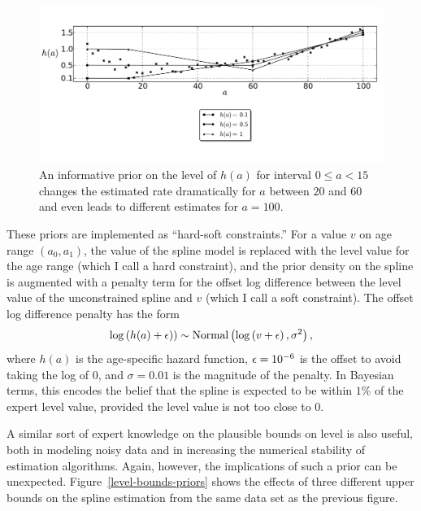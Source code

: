 \begin{figure}[h]
\begin{center}
\includegraphics[width=\textwidth]{level_value-smoothing-splines.pdf}
\caption[An informative prior on the level of $h(a)$.]{An informative
  prior on the level of $h(a)$ for interval $0 \leq a <
  15$ changes the estimated rate dramatically for $a$ between $20$ and
  $60$ and even leads to different estimates for $a = 100$.}
\label{level-value-priors}
\end{center}
\end{figure}



These priors are implemented as ``hard-soft constraints.''  For a
value $v$ on age range $(a_0,a_1)$, the value of the spline model is
replaced with the level value for the age range (which I call a hard
constraint), and the prior density on the spline is augmented with a
penalty term for the offset log difference between the level value of
the unconstrained spline and $v$ (which I call a soft constraint). The
offset log difference penalty has the form
\[
\log\left(h(a)+\epsilon)\right) \sim
 \operatorname{Normal}\left(\log\left(v + \epsilon\right), \sigma^2\right),
\]
where $h(a)$ is the age-specific hazard function, $\epsilon = 10^{-6}$ is the
offset to avoid taking the log of $0$, and $\sigma = 0.01$ is the
magnitude of the penalty.  In Bayesian terms, this encodes the belief
that the spline is expected to be within $1$\% of the expert level
value, provided the level value is not too close to $0$.

A similar sort of expert knowledge on the plausible bounds on
level is also useful, both in modeling noisy data and in increasing
the numerical stability of estimation algorithms. Again, however, the
implications of such a prior can be unexpected.
Figure~\ref{level-bounds-priors} shows the effects of three different
upper bounds on the spline estimation from the same data set as the
previous figure.

